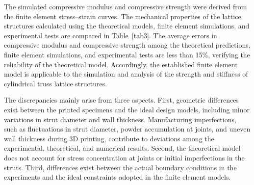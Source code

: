 \documentclass[12pt,a4paper]{article}
\begin{document}
The simulated compressive modulus and compressive strength were derived from the finite element stress--strain curves. The mechanical properties of the lattice structures calculated using the theoretical models, finite element simulations, and experimental tests are compared in Table~\ref{tab3}. The average errors in compressive modulus and compressive strength among the theoretical predictions, finite element simulations, and experimental tests are less than 15\%, verifying the reliability of the theoretical model. Accordingly, the established finite element model is applicable to the simulation and analysis of the strength and stiffness of cylindrical truss lattice structures.

The discrepancies mainly arise from three aspects. First, geometric differences exist between the printed specimens and the ideal design models, including minor variations in strut diameter and wall thickness. Manufacturing imperfections, such as fluctuations in strut diameter, powder accumulation at joints, and uneven wall thickness during 3D printing, contribute to deviations among the experimental, theoretical, and numerical results. Second, the theoretical model does not account for stress concentration at joints or initial imperfections in the struts. Third, differences exist between the actual boundary conditions in the experiments and the ideal constraints adopted in the finite element models.
\end{document}
